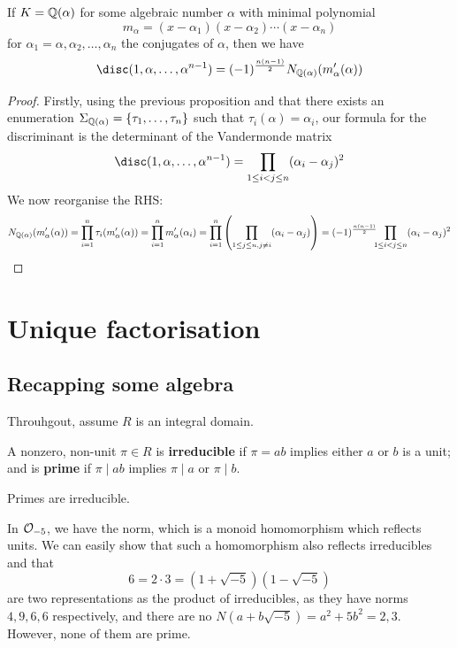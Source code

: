 \documentclass{article}
\begin{document}
\begin{proposition}
    If $K=\mathbb{Q}(\alpha)$ for some algebraic number $\alpha$ with minimal polynomial\[
    m_\alpha=(x-\alpha_1)(x-\alpha_2)\cdots(x-\alpha_n)
    \] for $\alpha_1=\alpha,\alpha_2,\ldots,\alpha_n$ the conjugates of $\alpha$, then we have \[
    \disc(1,\alpha,\ldots,\alpha^{n-1}) = (-1)^\frac{n(n-1)}{2}N_{\bQ(\alpha)}(m'_\alpha(\alpha))
    \]\begin{proof}
        Firstly, using the previous proposition and that there exists an enumeration $\Sigma_{\mathbb{Q}(\alpha)}=\{\tau_1,\ldots,\tau_n\}$ such that $\tau_i(\alpha)=\alpha_i$, our formula for the discriminant is the determinant of the Vandermonde matrix \[
        \disc(1,\alpha,\ldots,\alpha^{n-1}) = \prod_{1\leq i < j \leq n}(\alpha_i-\alpha_j)^2
        \] We now reorganise the RHS: \[
        N_{\mathbb{Q}(\alpha)}(m'_\alpha(\alpha)) = \prod_{i=1}^n\tau_i(m'_\alpha(\alpha)) = \prod_{i=1}^nm'_\alpha(\alpha_i) = \prod_{i=1}^n\left( \prod_{1\leq j\leq n, j\neq i}(\alpha_i-\alpha_j) \right) = (-1)^\frac{n(n-1)}{2}\hspace{-5pt} \prod_{1\leq i< j\leq n}(\alpha_i-\alpha_j)^2\qedhere
        \]
    \end{proof}
\end{proposition}

\section{Unique factorisation}

\subsection{Recapping some algebra}

Throuhgout, assume $R$ is an integral domain.

\begin{definition}
    A nonzero, non-unit $\pi\in R$ is \textbf{irreducible} if $\pi=ab$ implies either $a$ or $b$ is a unit; and is \textbf{prime} if $\pi\mid ab$ implies $\pi\mid a$ or $\pi\mid b$.
\end{definition}

\begin{lemma}
    Primes are irreducible.
\end{lemma}

In $\mathcal{O}_{-5}$, we have the norm, which is a monoid homomorphism which reflects units. We can easily show that such a homomorphism also reflects irreducibles and that\[
6 = 2\cdot 3 = (1+\sqrt{-5})(1-\sqrt{-5})
\] are two representations as the product of irreducibles, as they have norms $4,9,6,6$ respectively, and there are no $N(a+b\sqrt{-5})=a^2+5b^2=2,3$. However, none of them are prime.
\end{document}
